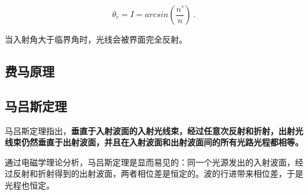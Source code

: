 \begin{equation}
\theta _c=I=arcsin(\frac{n'}{n}) ~.
\end{equation}

当入射角大于临界角时，光线会被界面完全反射。

\subsection{费马原理}

\subsection{马吕斯定理}

马吕斯定理指出，\textbf{垂直于入射波面的入射光线束，经过任意次反射和折射，出射光线束仍然垂直于出射波面，并且在入射波面和出射波面间的所有光路光程都相等。}

通过电磁学理论分析，马吕斯定理是显而易见的：同一个光源发出的入射波面，经过反射和折射得到的出射波面，两者相位差是恒定的。波的行进带来相位差，于是光程也恒定。
